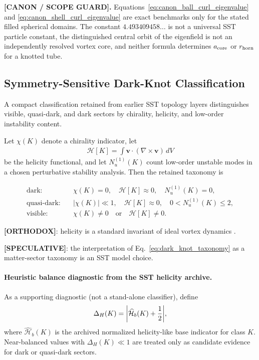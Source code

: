 \documentclass[11pt]{article}
\theoremstyle{definition}
\theoremstyle{plain}
\theoremstyle{remark}
\begin{document}
    \textbf{[CANON / SCOPE GUARD].}
    Equations~\eqref{eq:canon_ball_curl_eigenvalue} and
    \eqref{eq:canon_shell_curl_eigenvalue} are exact benchmarks only for the stated
    filled spherical domains.  The constant \(4.493409458\ldots\) is not a universal
    SST particle constant, the distinguished central orbit of the eigenfield is not
    an independently resolved vortex core, and neither formula determines
    \(a_{\rm core}\) or \(r_{\rm horn}\) for a knotted tube.

\subsection{Symmetry-Sensitive Dark-Knot Classification}
    \label{subsec:dark_knot_classification}

    A compact classification retained from earlier SST topology layers distinguishes visible, quasi-dark, and dark sectors by chirality, helicity, and low-order instability content.

    Let $\chi(K)$ denote a chirality indicator, let
    \begin{align}
        \mathcal{H}[K] = \int \mathbf{v}\cdot(\nabla\times\mathbf{v})\,dV
    \end{align}
    be the helicity functional, and let $N_u^{(1)}(K)$ count low-order unstable modes in a chosen perturbative stability analysis. Then the retained taxonomy is

    \begin{align}
        \text{dark:}&\quad \chi(K)=0,\quad \mathcal{H}[K]\approx 0,\quad N_u^{(1)}(K)=0, \\
        \text{quasi-dark:}&\quad |\chi(K)|\ll 1,\quad \mathcal{H}[K]\approx 0,\quad 0 < N_u^{(1)}(K)\le 2, \\
        \text{visible:}&\quad \chi(K)\neq 0 \quad \text{or}\quad \mathcal{H}[K]\neq 0.
        \label{eq:dark_knot_taxonomy}
    \end{align}

    \textbf{[ORTHODOX]}: helicity is a standard invariant of ideal vortex dynamics \cite{Moffatt1969,Batchelor1967}.

    \textbf{[SPECULATIVE]}: the interpretation of Eq.~\eqref{eq:dark_knot_taxonomy} as a matter-sector taxonomy is an SST model choice.

    \paragraph{Heuristic balance diagnostic from the SST helicity archive.}
    As a supporting diagnostic (not a stand-alone classifier), define
    \begin{align}
        \Delta_H(K)=\abs{\widehat{\mathcal{H}}_{b}(K)+\frac{1}{2}},
    \end{align}
    where $\widehat{\mathcal{H}}_{b}(K)$ is the archived normalized helicity-like base indicator for class $K$.
    Near-balanced values with $\Delta_H(K)\ll 1$ are treated only as candidate evidence for dark or quasi-dark sectors.
\end{document}
